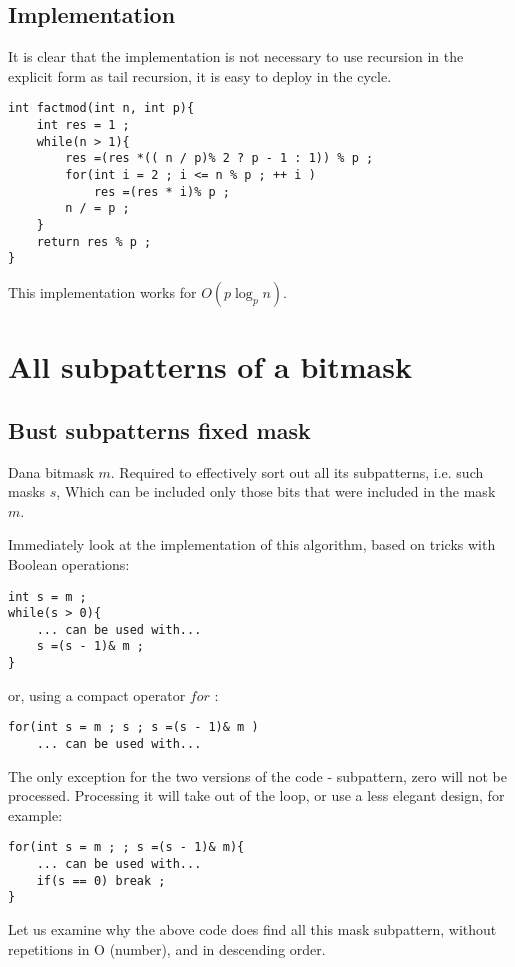 \subsection{ Implementation }

It is clear that the implementation is not necessary to use recursion in the explicit form as tail recursion, it is easy to deploy in the cycle.

\begin{verbatim}
int factmod(int n, int p){
    int res = 1 ;
    while(n > 1){
        res =(res *(( n / p)% 2 ? p - 1 : 1)) % p ;
        for(int i = 2 ; i <= n % p ; ++ i )
            res =(res * i)% p ;
        n / = p ;
    }
    return res % p ;
} 
\end{verbatim}
This implementation works for $O (p \log_p n)$.

\section{ All subpatterns of a bitmask }
\subsection{ Bust subpatterns fixed mask }

Dana bitmask $m$. Required to effectively sort out all its subpatterns, i.e. such masks $s$, Which can be included only those bits that were included in the mask $m$.

Immediately look at the implementation of this algorithm, based on tricks with Boolean operations:

\begin{verbatim}
int s = m ;
while(s > 0){
    ... can be used with...
    s =(s - 1)& m ;
} 
\end{verbatim}
or, using a compact operator $for$ :

\begin{verbatim}
for(int s = m ; s ; s =(s - 1)& m )
    ... can be used with...
\end{verbatim}
The only exception for the two versions of the code - subpattern, zero will not be processed. Processing it will take out of the loop, or use a less elegant design, for example:

\begin{verbatim}
for(int s = m ; ; s =(s - 1)& m){
    ... can be used with...
    if(s == 0) break ;
} 
\end{verbatim}
Let us examine why the above code does find all this mask subpattern, without repetitions in O (number), and in descending order.

